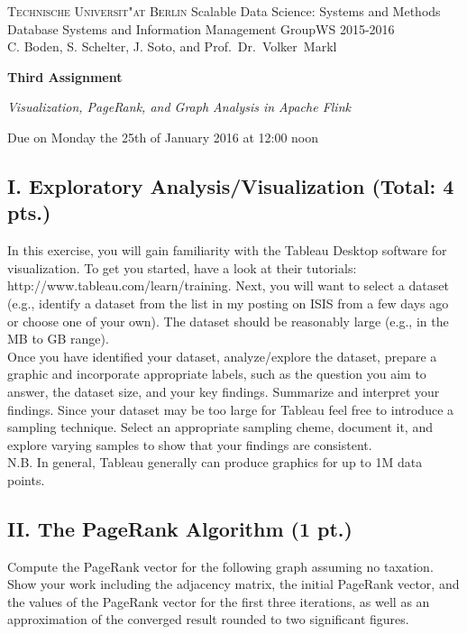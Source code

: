 \documentclass[11pt,a4paper]{article}
\begin{document}
\textsc{Technische Universit"at Berlin}{\small\hfill 
Scalable Data Science: Systems and Methods }\\
{\small Database Systems and Information Management Group{\small\hfill WS 2015-2016}\\
C. Boden, S. Schelter, J. Soto, and Prof.~Dr.~Volker~Markl}

\bigskip
\centerline{\Large\textbf{Third Assignment}}
\centerline{\emph{Visualization, PageRank, and Graph Analysis in Apache Flink}}
{\color{red}
\centerline{Due on Monday the 25th of January 2016 at 12:00 noon}
}
\bigskip


\subsection*{I. Exploratory Analysis/Visualization {\color{red}(Total: 4 pts.)}}

In this exercise, you will gain familiarity with the Tableau Desktop software for visualization. To get you started, have a look at their tutorials: http://www.tableau.com/learn/training. Next, you will want to select a dataset (e.g., identify a dataset from the list in my posting on ISIS from a few days ago or choose one of your own). The dataset should be reasonably large (e.g., in the MB to GB range). \\

Once you have identified your dataset, analyze/explore the dataset, prepare a graphic and incorporate appropriate labels, such as the question you aim to answer, the dataset size, and your key findings. Summarize and interpret your findings. Since your dataset may be too large for Tableau feel free to introduce a sampling technique. Select an appropriate sampling cheme, document it, and explore varying samples to show that your findings are consistent. \\

N.B. In general, Tableau generally can produce graphics for up to 1M data points.\\


\subsection*{II. The PageRank Algorithm  {\color{red}(1 pt.)}} 
Compute the PageRank vector for the following graph assuming no taxation. Show your work including the adjacency matrix, the initial PageRank vector, and the values of the PageRank vector for the first three iterations, as well as an approximation of the converged result rounded to two significant figures.
\end{document}
